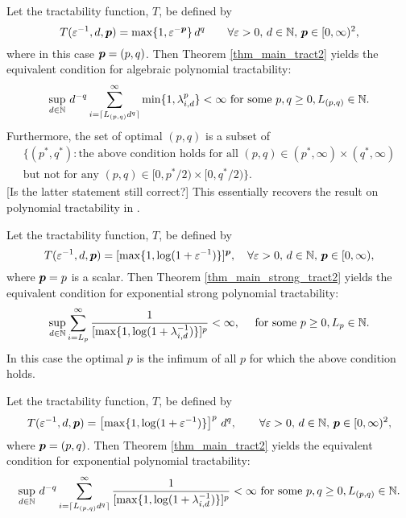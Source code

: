 \documentclass[sort&compress]{elsarticle}
\newcommand{\fred}[1]{\begingroup\color{blue}#1\endgroup}
\newcommand{\peter}[1]{\begingroup\color{violet}#1\endgroup}
\begin{document}
\begin{example}
Let the tractability function, $T$,
be defined by
\[
 T(\varepsilon^{-1},d,\boldsymbol{p})= \max\{1,\varepsilon^{-\boldsymbol{p}}\}\, d^q
 \qquad \forall \varepsilon > 0, \,  d \in \mathbb{N}, \, \boldsymbol{p} \in [0,\infty)^2,
\] where in this case $\boldsymbol{p} = (p,q)$.
Then Theorem \ref{thm_main_tract2} yields the  equivalent condition for algebraic polynomial tractability:
\[
 \sup_{d\in\mathbb{N}}\, d^{-q} \sum_{i=\lceil L_{(p,q)} d^{q}\rceil}^\infty \min\{1,\lambda_{i,d}^p\}  < \infty \text{ for some } p,q \ge 0, L_{(p,q)} \in \mathbb{N}.
\]
Furthermore, the set of optimal $(p,q)$ is a subset of
\begin{multline*}
\{(p^*,q^*) : \text{the above condition holds for all }(p,q) \in (p^*,\infty) \times (q^*,\infty) \\
\text{but not for any }(p,q) \in [0,p^*/2) \times [0,q^*/2)\}.
\end{multline*}
\peter{[Is the latter statement still correct?]}
This essentially recovers the result on polynomial tractability in \cite[Theorem 5.1]{NovWoz08a}. %
\end{example}


\begin{example}
Let the tractability function, $T$,
be defined by
\[
 T(\varepsilon^{-1},d,\boldsymbol{p})= [\max\{1,\log(1+\varepsilon^{-1})\}]^{\boldsymbol{p}}, \quad \forall \varepsilon > 0, \,  d \in \mathbb{N}, \, \boldsymbol{p} \in [0,\infty),
\]
where $\boldsymbol{p}=p$ is a scalar. Then Theorem \ref{thm_main_strong_tract2} yields the equivalent condition for exponential strong polynomial tractability:
\begin{equation}\label{eq:exp_spt}
 \sup_{d\in\mathbb{N}} \sum_{i=L_{p} }^\infty \frac{1}{[\max\{1,\log(1+\lambda_{i,d}^{-1})\}]^{p}}  < \infty,\quad  \text{ for some } p \ge 0, L_{p} \in \mathbb{N}.
\end{equation}
In this case the optimal $p$ is the infimum of all $p$ for which the above condition holds.
\end{example}
\begin{example}
Let the tractability function, $T$,
be defined by
\[
 T(\varepsilon^{-1},d,\boldsymbol{p})=\left[\max\{1,\log(1+\varepsilon^{-1})\}\right]^p\, d^q, \qquad \forall \varepsilon > 0, \,  d \in \mathbb{N}, \, \boldsymbol{p} \in [0,\infty)^2,
\] where $\boldsymbol{p} = (p,q)$. Then Theorem \ref{thm_main_tract2} yields  the equivalent condition for exponential polynomial tractability:
\begin{equation}\label{eq:exp_pt}
 \sup_{d\in\mathbb{N}}\, d^{-q} \sum_{i=\lceil L_{(p,q)} d^{q}\rceil}^\infty \frac{1}{[\max\{1,\log(1+\lambda_{i,d}^{-1})\}]^p} < \infty  \text{ for some } p,q \ge 0, L_{(p,q)} \in \mathbb{N}.
\end{equation}
\end{example}
\end{document}
